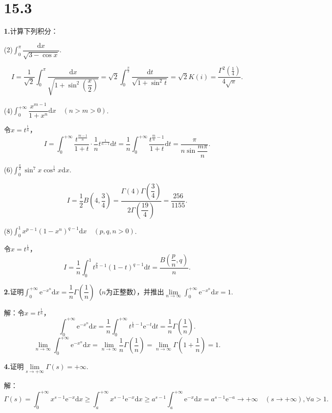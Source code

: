 \documentclass[12pt, a4paper]{article}
\newcommand{\e}{\mathrm{e}}
\newcommand{\dif}{\mathrm{d}}
\begin{document}
\section*{15.3}
\textbf{1.}计算下列积分：

(2)\(\int_0^\pi \dfrac{\dif x}{\sqrt{3 - \cos x}}\).

\[I = \frac{1}{\sqrt{2}}\int_0^\pi \frac{\dif x}{\sqrt{1 + \sin^2\left(\dfrac{x}{2}\right)}} = \sqrt{2}\int_{0}^{\frac{\pi}{2}} \frac{\dif t}{\sqrt{1 + \sin^2t}} = \sqrt{2}K(i) = \frac{\Gamma^2\left(\frac{1}{4}\right)}{4\sqrt{\pi}}.\]

(4)\(\int_{0}^{+\infty} \dfrac{x^{m - 1}}{1 + x^n}\dif x \quad (n > m > 0)\).

令\(x = t^{\frac{1}{n}}\)，
\[I = \int_{0}^{+\infty} \frac{t^{\frac{m - 1}{n}}}{1 + t} \cdot \frac{1}{n}t^{\frac{1}{n - 1}}\dif t = \frac{1}{n}\int_{0}^{+\infty} \frac{t^{\frac{m}{n} - 1}}{1 + t}\dif t = \frac{\pi}{n\sin\dfrac{m\pi}{n}}.\]

(6)\(\int_{0}^{\frac{\pi}{2}} \sin^7x\cos^{\frac{1}{2}}x\dif x\).

\[I = \frac{1}{2}B\left(4, \frac{3}{4}\right) = \frac{\Gamma(4)\Gamma\left(\dfrac{3}{4}\right)}{2\Gamma\left(\dfrac{19}{4}\right)} = \frac{256}{1155}.\]

(8)\(\int_0^1 x^{p - 1}(1 - x^n)^{q - 1}\dif x \quad (p, q, n > 0)\).

令\(x = t^{\frac{1}{n}}\)，
\[I = \frac{1}{n}\int_0^1 t^{\frac{p}{n} - 1}(1 - t)^{q - 1}\dif t = \frac{B\left(\dfrac{p}{n}, q\right)}{n}.\]

\textbf{2.}证明\(\int_{0}^{+\infty} \e^{-x^n}\dif x = \dfrac{1}{n}\Gamma\left(\dfrac{1}{n}\right)\)（\(n\)为正整数），并推出\(\lim\limits_{n \to \infty} \int_{0}^{+\infty} \e^{-x^n}\dif x = 1\).

解：令\(x = t^{\frac{1}{n}}\)，
\[\int_{0}^{+\infty} \e^{-x^n}\dif x = \frac{1}{n}\int_{0}^{+\infty} t^{\frac{1}{n} - 1}\e^{-t}\dif t = \frac{1}{n}\Gamma\left(\frac{1}{n}\right).\]
\[\lim_{n \to \infty} \int_{0}^{+\infty} \e^{-x^n}\dif x = \lim_{n \to \infty} \frac{1}{n}\Gamma\left(\frac{1}{n}\right) = \lim_{n \to \infty} \Gamma(1 + \frac{1}{n}) = 1.\]

\textbf{4.}证明\(\lim\limits_{s \to +\infty} \Gamma(s) = +\infty\).

解：
\[\Gamma(s) = \int_{0}^{+\infty} x^{s - 1}\e^{-x} \dif x \geq \int_{a}^{+\infty} x^{s - 1}\e^{-x}\dif x \geq a^{s - 1}\int_{a}^{+\infty}\e^{-x}\dif x = a^{s - 1}\e^{-a} \to +\infty \quad (s \to +\infty), \forall a > 1.\]
\end{document}
